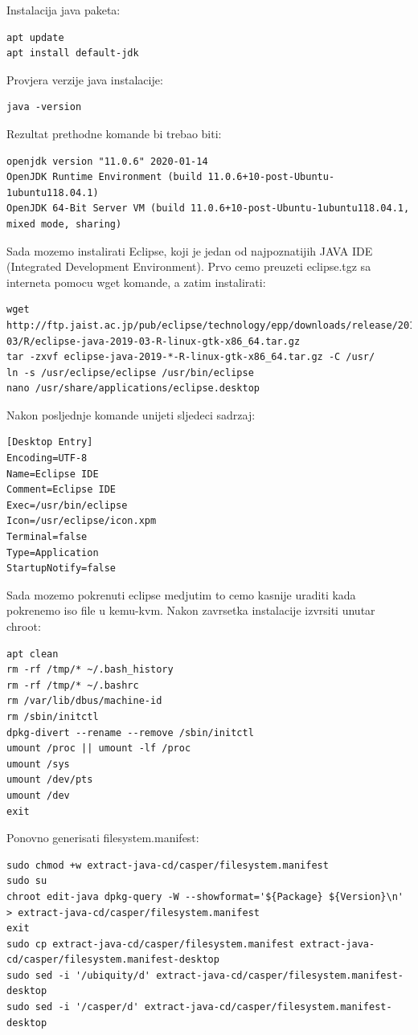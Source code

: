 \documentclass[12pt,vi]{mitthesis}
\begin{document}
\noindent
Instalacija java paketa:
\begin{lstlisting}[style=BashInputStyle]
apt update
apt install default-jdk
\end{lstlisting}
Provjera verzije java instalacije:
\begin{lstlisting}[style=BashInputStyle]
java -version
\end{lstlisting}
Rezultat prethodne komande bi trebao biti:
\begin{lstlisting}[style=BashInputStyle]
openjdk version "11.0.6" 2020-01-14
OpenJDK Runtime Environment (build 11.0.6+10-post-Ubuntu-1ubuntu118.04.1)
OpenJDK 64-Bit Server VM (build 11.0.6+10-post-Ubuntu-1ubuntu118.04.1, mixed mode, sharing)
\end{lstlisting}
Sada mozemo instalirati Eclipse, koji je jedan od najpoznatijih JAVA IDE (Integrated Development Environment). Prvo cemo preuzeti eclipse.tgz sa interneta pomocu wget komande, a zatim instalirati:
\begin{lstlisting}[style=BashInputStyle]
wget http://ftp.jaist.ac.jp/pub/eclipse/technology/epp/downloads/release/2019-03/R/eclipse-java-2019-03-R-linux-gtk-x86_64.tar.gz
tar -zxvf eclipse-java-2019-*-R-linux-gtk-x86_64.tar.gz -C /usr/
ln -s /usr/eclipse/eclipse /usr/bin/eclipse
nano /usr/share/applications/eclipse.desktop
\end{lstlisting}
Nakon posljednje komande unijeti sljedeci sadrzaj:
\begin{lstlisting}[style=BashInputStyle]
[Desktop Entry]
Encoding=UTF-8
Name=Eclipse IDE
Comment=Eclipse IDE
Exec=/usr/bin/eclipse
Icon=/usr/eclipse/icon.xpm
Terminal=false
Type=Application
StartupNotify=false
\end{lstlisting}
Sada mozemo pokrenuti eclipse medjutim to cemo kasnije uraditi kada pokrenemo iso file u kemu-kvm.
\noindent
Nakon zavrsetka instalacije izvrsiti unutar chroot:
\begin{lstlisting}[style=BashInputStyle]
apt clean
rm -rf /tmp/* ~/.bash_history
rm -rf /tmp/* ~/.bashrc
rm /var/lib/dbus/machine-id
rm /sbin/initctl
dpkg-divert --rename --remove /sbin/initctl
umount /proc || umount -lf /proc
umount /sys
umount /dev/pts
umount /dev
exit
\end{lstlisting}

\noindent
Ponovno generisati filesystem.manifest:
\begin{lstlisting}[style=BashInputStyle]
sudo chmod +w extract-java-cd/casper/filesystem.manifest
sudo su
chroot edit-java dpkg-query -W --showformat='${Package} ${Version}\n' > extract-java-cd/casper/filesystem.manifest
exit
sudo cp extract-java-cd/casper/filesystem.manifest extract-java-cd/casper/filesystem.manifest-desktop
sudo sed -i '/ubiquity/d' extract-java-cd/casper/filesystem.manifest-desktop
sudo sed -i '/casper/d' extract-java-cd/casper/filesystem.manifest-desktop
\end{lstlisting}
\end{document}
